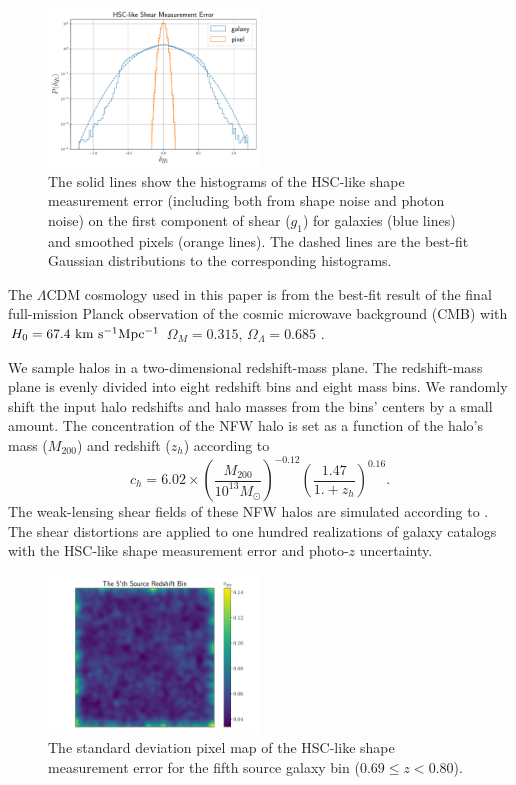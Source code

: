 \begin{figure}
 \centering
 \includegraphics[width=0.5\textwidth]{shapeMeasurementError-HSCY1.pdf}
 \caption{The solid lines show the histograms of the HSC-like shape measurement
     error (including both from shape noise and photon noise) on the first
     component of shear ($g_1$) for galaxies (blue lines) and smoothed pixels
     (orange lines). The dashed lines are the best-fit Gaussian distributions
     to the corresponding histograms.
    }
 \label{fig_noiseHistogram}
\end{figure}

The $\Lambda$CDM cosmology used in this paper is from the best-fit result of
the final full-mission Planck observation of the cosmic microwave background
(CMB) with $H_0=67.4 ~\rm{km~s^{-1} Mpc^{-1}}$ $\Omega_M=0.315$,
$\Omega_\Lambda=0.685$ \citep{cmb-Planck2018-Cosmology}.

We sample halos in a two-dimensional redshift-mass plane. The redshift-mass
plane is evenly divided into eight redshift bins and eight mass bins. We
randomly shift the input halo redshifts and halo masses from the bins' centers
by a small amount. The concentration of the NFW halo is set as a function of
the halo's mass ($M_{200}$) and redshift ($z_{h}$) according to
\citet{c-M_Magneticum-Ragagnin2019}
\begin{equation}
c_{h}=6.02\times(\frac{M_{200}}{10^{13} M_{\odot}})^{-0.12}(\frac{1.47}{1.+z_h})^{0.16}.
\end{equation}
The weak-lensing shear fields of these NFW halos are simulated according to
\citet{haloModel-TJ2003-3pt}. The shear distortions are applied to one hundred
realizations of galaxy catalogs with the HSC-like shape measurement error and
photo-$z$ uncertainty.

\begin{figure}
 \centering
 \includegraphics[width=0.5\textwidth]{noise_std_map_pix.pdf}
 \caption{The standard deviation pixel map of the HSC-like shape measurement
     error for the fifth source galaxy bin ($0.69 \leq z < 0.80 $).
        } \label{fig_noistdmap}
\end{figure}

